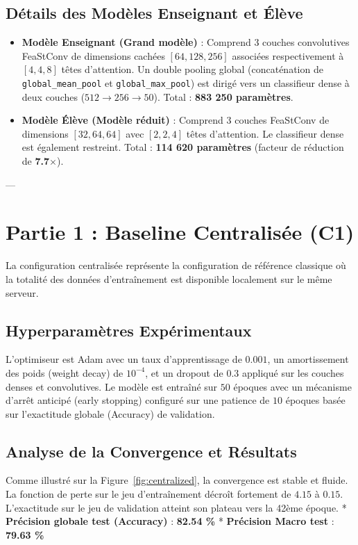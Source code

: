 \documentclass[11pt,a4paper]{article}
\begin{document}
\subsection{Détails des Modèles Enseignant et Élève}
\begin{itemize}
    \item \textbf{Modèle Enseignant (Grand modèle)} : Comprend 3 couches convolutives FeaStConv de dimensions cachées $[64, 128, 256]$ associées respectivement à $[4, 4, 8]$ têtes d'attention. Un double pooling global (concaténation de \texttt{global\_mean\_pool} et \texttt{global\_max\_pool}) est dirigé vers un classifieur dense à deux couches ($512 \to 256 \to 50$). Total : \textbf{883 250 paramètres}.
    \item \textbf{Modèle Élève (Modèle réduit)} : Comprend 3 couches FeaStConv de dimensions $[32, 64, 64]$ avec $[2, 2, 4]$ têtes d'attention. Le classifieur dense est également restreint. Total : \textbf{114 620 paramètres} (facteur de réduction de \textbf{7.7$\times$}).
\end{itemize}

---

\section{Partie 1 : Baseline Centralisée (C1)}
La configuration centralisée représente la configuration de référence classique où la totalité des données d'entraînement est disponible localement sur le même serveur.

\subsection{Hyperparamètres Expérimentaux}
L'optimiseur est Adam avec un taux d'apprentissage de $0.001$, un amortissement des poids (weight decay) de $10^{-4}$, et un dropout de $0.3$ appliqué sur les couches denses et convolutives. Le modèle est entraîné sur $50$ époques avec un mécanisme d'arrêt anticipé (early stopping) configuré sur une patience de $10$ époques basée sur l'exactitude globale (Accuracy) de validation.

\subsection{Analyse de la Convergence et Résultats}
Comme illustré sur la Figure~\ref{fig:centralized}, la convergence est stable et fluide. La fonction de perte sur le jeu d'entraînement décroît fortement de $4.15$ à $0.15$. L'exactitude sur le jeu de validation atteint son plateau vers la 42ème époque. 
* \textbf{Précision globale test (Accuracy)} : \textbf{82.54 \%}
* \textbf{Précision Macro test} : \textbf{79.63 \%}
\end{document}
